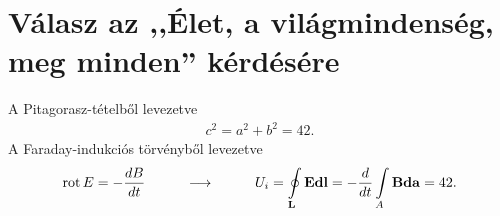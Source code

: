 \clearpage\section{Válasz az ,,Élet, a világmindenség, meg minden'' kérdésére}
A Pitagorasz-tételből levezetve
\begin{align}
c^2=a^2+b^2=42.
\end{align}
A Faraday-indukciós törvényből levezetve
\begin{align}
\operatorname{rot} E=-\frac{dB}{dt}\hspace{1cm}\longrightarrow \hspace{1cm}
U_i=\oint\limits_\mathbf{L}{\mathbf{E}\mathbf{dl}}=-\frac{d}{dt}\int\limits_A{\mathbf{B}\mathbf{da}}=42.
\end{align}
